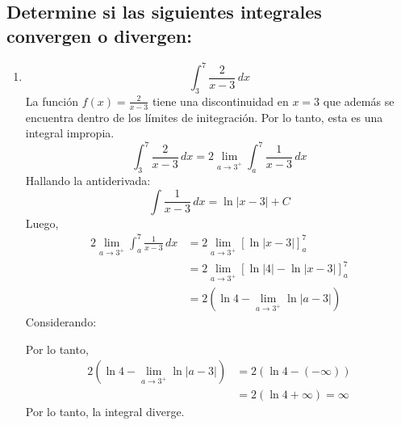 \begin{multicols}{2}
  \section{Determine si las siguientes integrales convergen o divergen:}

  \begin{enumerate}
    \item
    \[
      \displaystyle \int_{3}^{7} \frac{2}{x-3} \, dx
    \]
  La función \( f(x) = \frac{2}{x-3} \) tiene una discontinuidad en \( x = 3 \) que además se encuentra dentro de los límites de initegración. Por lo tanto, esta es una integral impropia.
  \[
    \int_{3}^{7} \frac{2}{x-3} \, dx = 2 \lim_{a \to 3^{+}} \int_{a}^{7} \frac{1}{x-3} \, dx 
  \]
  Hallando la antiderivada:
  \[
    \int \frac{1}{x-3} \, dx = \ln{|
    x-3|} + C
  \]
  Luego, 
  \[
    \begin{aligned}
      2 \lim_{a \to 3^{+}} \int_{a}^{7} \frac{1}{x-3} \, dx &= 2 \lim_{a \to 3^{+}} \left[ \ln{|x-3|} \right]_{a}^{7} \\
      &= 2 \lim_{a \to 3^{+}} \left[ \ln{|4|} - \ln{|x-3|} \right]_{a}^{7} \\
      &= 2 \left(\ln{4} - \lim_{a \to 3^{+}} \ln{|a-3|}\right)
    \end{aligned}
  \]
  Considerando:
  \begin{center}
  \end{center}
  Por lo tanto,
  \[
    \begin{aligned}
      2 \left(\ln{4} - \lim_{a \to 3^{+}} \ln{|a-3|}\right) &= 2 (\ln{4} - (-\infty)) \\
      &= 2 (\ln{4} + \infty) = \infty
    \end{aligned}
  \]
  Por lo tanto, la integral diverge.  
  

\end{enumerate}
\end{multicols}
